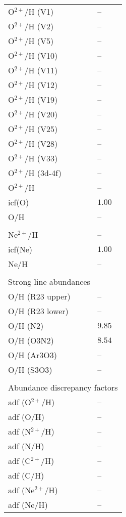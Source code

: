\begin{longtable}[l]{ll}
 \\
 O$^{2+}$/H (V1)                     & -- \\
 O$^{2+}$/H (V2)                     & -- \\
 O$^{2+}$/H (V5)                     & -- \\
 O$^{2+}$/H (V10)                    & -- \\
 O$^{2+}$/H (V11)                    & -- \\
 O$^{2+}$/H (V12)                    & -- \\
 O$^{2+}$/H (V19)                    & -- \\
 O$^{2+}$/H (V20)                    & -- \\
 O$^{2+}$/H (V25)                    & -- \\
 O$^{2+}$/H (V28)                    & -- \\
 O$^{2+}$/H (V33)                    & -- \\
 O$^{2+}$/H (3d-4f)                  & -- \\
 O$^{2+}$/H                          & -- \\
 icf(O)                              & $  1.00$\\
 O/H                                 & -- \\
 \\
 Ne$^{2+}$/H                         & -- \\
 icf(Ne)                             & $  1.00$\\
 Ne/H                                & -- \\
 \vspace{0.2cm}\\\multicolumn{2}{l}{Strong line abundances}\\ \hline
 O/H (R23 upper)                     & -- \\
 O/H (R23 lower)                     & -- \\
 O/H (N2)                            & $  9.85$\\
 O/H (O3N2)                          & $  8.54$\\
 O/H (Ar3O3)                         & -- \\
 O/H (S3O3)                          & -- \\
 \vspace{0.2cm}\\\multicolumn{2}{l}{Abundance discrepancy factors}\\ \hline
 adf (O$^{2+}$/H)                    & -- \\
 adf (O/H)                           & -- \\
 adf (N$^{2+}$/H)                    & -- \\
 adf (N/H)                           & -- \\
 adf (C$^{2+}$/H)                    & -- \\
 adf (C/H)                           & -- \\
 adf (Ne$^{2+}$/H)                   & -- \\
 adf (Ne/H)                          & -- \\
 \end{longtable}

